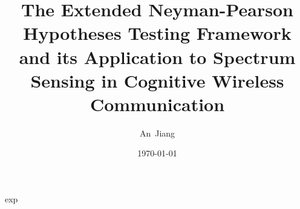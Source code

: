 \documentclass{report}
\author{An~Jiang}
\title{The Extended Neyman-Pearson Hypotheses Testing Framework and its Application to Spectrum Sensing in Cognitive Wireless Communication}
\date{\today}
\begin{document}
\begin{spacing}{2.0}
\maketitle
{exp}

\newpage
\end{spacing}
\end{document}
